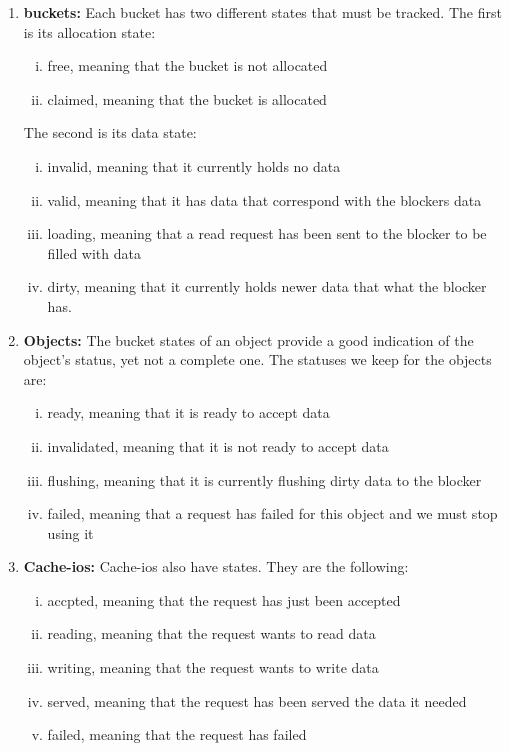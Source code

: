 \begin{enumerate}
\item \textbf{buckets:} Each bucket has two different states that must be 
	tracked. The first is its allocation state:
	\begin{enumerate}[i)]
		\item free, meaning that the bucket is not allocated
		\item claimed, meaning that the bucket is allocated
	\end{enumerate}
	The second is its data state:
	\begin{enumerate}[i)]
		\item invalid, meaning that it currently holds no data
		\item valid, meaning that it has data that correspond with the 
			blockers data
		\item loading, meaning that a read request has been sent to the 
			blocker to be filled with data
		\item dirty, meaning that it currently holds newer data that 
			what the blocker has.
	\end{enumerate}
\item \textbf{Objects:} The bucket states of an object provide a good 
	indication of the object's status, yet not a complete one. The statuses 
	we keep for the objects are:
	\begin{enumerate}[i)]
		\item ready, meaning that it is ready to accept data
		\item invalidated, meaning that it is not ready to accept data
		\item flushing, meaning that it is currently flushing dirty 
			data to the blocker
		\item failed, meaning that a request has failed for this object 
			and we must stop using it
	\end{enumerate}
\item \textbf{Cache-ios:} Cache-ios also have states. They are the 
	following:
	\begin{enumerate}[i)]
		\item accpted, meaning that the request has just been accepted
		\item reading, meaning that the request wants to read data
		\item writing, meaning that the request wants to write data
		\item served, meaning that the request has been served the data 
			it needed
		\item failed, meaning that the request has failed
	\end{enumerate}
\end{enumerate}

